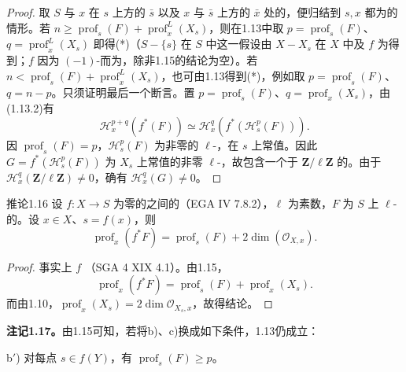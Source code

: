 \begin{proof}
取 $S$ 与 $x$ 在 $s$ 上方的 $\bar s$ 以及 $x$ 与 $\bar s$ 上方的 $\bar x$ 处的，便归结到 $s,x$ 都为的情形。若 $n\geq\operatorname{prof}_s(F)+\operatorname{prof}_x^L(X_s)$，则在1.13中取 $p=\operatorname{prof}_s(F)$、$q=\operatorname{prof}_x^L(X_s)$ 即得(*)（$S-\{s\}$ 在 $S$ 中这一假设由 $X-X_s$ 在 $X$ 中及 $f$ 为得到；$f$ 因为 $(-1)$-而为，除非1.15的结论为空）。若 $n<\operatorname{prof}_s(F)+\operatorname{prof}_x^L(X_s)$，也可由1.13得到(*)，例如取 $p=\operatorname{prof}_s(F)$、$q=n-p$。只须证明最后一个断言。置 $p=\operatorname{prof}_s(F)$、$q=\operatorname{prof}_x(X_s)$，由(1.13.2)有
\[\mathcal H_x^{p+q}(f^*(F))\simeq\mathcal H_x^q(f^*(\mathcal H_s^p(F))).\]
因 $\operatorname{prof}_s(F)=p$，$\mathcal H_s^p(F)$ 为非零的 $\ell$-，在 $s$ 上常值。因此 $G=f^*(\mathcal H_s^p(F))$ 为 $X_s$ 上常值的非零 $\ell$-，故包含一个于 $\mathbf Z/\ell\mathbf Z$ 的。由于 $\mathcal H_x^q(\mathbf Z/\ell\mathbf Z)\ne0$，确有 $\mathcal H_x^q(G)\ne0$。
\end{proof}
\begin{SGAresult}{推论}{1.16}
设 $f:X\to S$ 为零的之间的（EGA IV 7.8.2），$\ell$ 为素数，$F$ 为 $S$ 上 $\ell$-的。设 $x\in X$、$s=f(x)$，则
\[\operatorname{prof}_x(f^*F)=\operatorname{prof}_s(F)+2\dim(\mathcal O_{X,x}).\]
\end{SGAresult}
\begin{proof}
事实上 $f$ （SGA 4 XIX 4.1）。由1.15，
\[\operatorname{prof}_x(f^*F)=\operatorname{prof}_s(F)+\operatorname{prof}_x(X_s).\]
而由1.10，$\operatorname{prof}_x(X_s)=2\dim\mathcal O_{X_s,x}$，故得结论。
\end{proof}
\textbf{注记1.17。}由1.15可知，若将b)、c)换成如下条件，1.13仍成立：

b$'$) 对每点 $s\in f(Y)$，有 $\operatorname{prof}_s(F)\geq p$。

